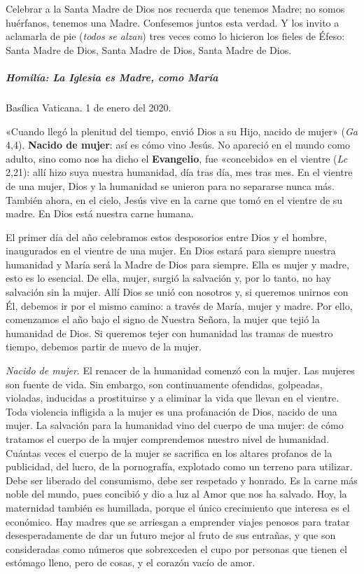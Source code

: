 \documentclass[]{article}
\let\oldsubparagraph\subparagraph
\renewcommand{\subparagraph}[1]{\oldsubparagraph{#1}\mbox{}}
\begin{document}
Celebrar a la Santa Madre de Dios nos recuerda que tenemos Madre; no
somos huérfanos, tenemos una Madre. Confesemos juntos esta verdad. Y los
invito a aclamarla de pie (\emph{todos se alzan}) tres veces como lo
hicieron los fieles de Éfeso: Santa Madre de Dios, Santa Madre de Dios,
Santa Madre de Dios.

\subparagraph{Homilía: La Iglesia es Madre, como
María}\label{homiluxeda-la-iglesia-es-madre-como-maruxeda}

Basílica Vaticana. 1 de enero del 2020.

«Cuando llegó la plenitud del tiempo, envió Dios a su Hijo, nacido de
mujer» (\emph{Ga} 4,4). \textbf{Nacido de mujer}: así es cómo vino
Jesús. No apareció en el mundo como adulto, sino como nos ha dicho el
\textbf{Evangelio}, fue «concebido» en el vientre (\emph{Lc} 2,21): allí
hizo suya nuestra humanidad, día tras día, mes tras mes. En el vientre
de una mujer, Dios y la humanidad se unieron para no separarse nunca
más. También ahora, en el cielo, Jesús vive en la carne que tomó en el
vientre de su madre. En Dios está nuestra carne humana.

El primer día del año celebramos estos desposorios entre Dios y el
hombre, inaugurados en el vientre de una mujer. En Dios estará para
siempre nuestra humanidad y María será la Madre de Dios para siempre.
Ella es mujer y madre, esto es lo esencial. De ella, mujer, surgió la
salvación y, por lo tanto, no hay salvación sin la mujer. Allí Dios se
unió con nosotros y, si queremos unirnos con Él, debemos ir por el mismo
camino: a través de María, mujer y madre. Por ello, comenzamos el año
bajo el signo de Nuestra Señora, la mujer que tejió la humanidad de
Dios. Si queremos tejer con humanidad las tramas de nuestro tiempo,
debemos partir de nuevo de la mujer.

\emph{Nacido de mujer}. El renacer de la humanidad comenzó con la mujer.
Las mujeres son fuente de vida. Sin embargo, son continuamente
ofendidas, golpeadas, violadas, inducidas a prostituirse y a eliminar la
vida que llevan en el vientre. Toda violencia infligida a la mujer es
una profanación de Dios, nacido de una mujer. La salvación para la
humanidad vino del cuerpo de una mujer: de cómo tratamos el cuerpo de la
mujer comprendemos nuestro nivel de humanidad. Cuántas veces el cuerpo
de la mujer se sacrifica en los altares profanos de la publicidad, del
lucro, de la pornografía, explotado como un terreno para utilizar. Debe
ser liberado del consumismo, debe ser respetado y honrado. Es la carne
más noble del mundo, pues concibió y dio a luz al Amor que nos ha
salvado. Hoy, la maternidad también es humillada, porque el único
crecimiento que interesa es el económico. Hay madres que se arriesgan a
emprender viajes penosos para tratar desesperadamente de dar un futuro
mejor al fruto de sus entrañas, y que son consideradas como números que
sobrexceden el cupo por personas que tienen el estómago lleno, pero de
cosas, y el corazón vacío de amor.
\end{document}

